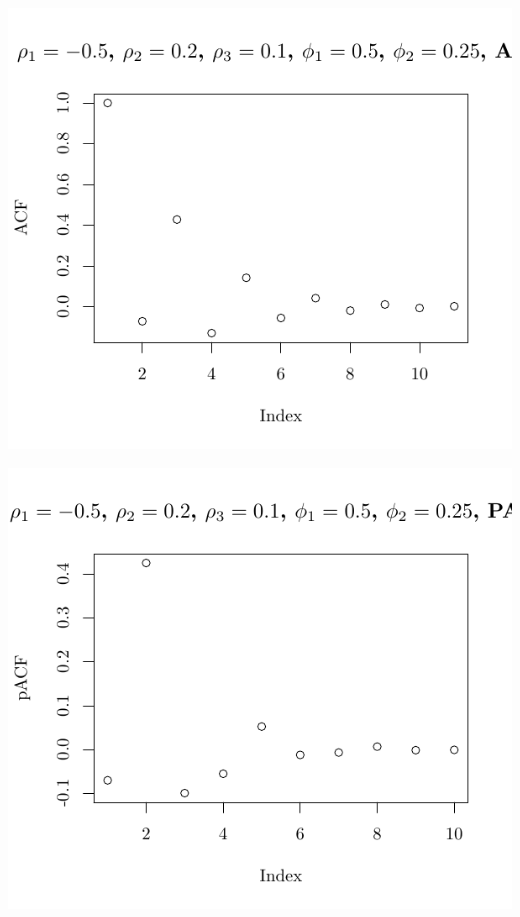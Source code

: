 \documentclass[10pt]{paper}\usepackage[]{graphicx}\usepackage[]{color}
\makeatletter
\def\maxwidth{ %
  \ifdim\Gin@nat@width>\linewidth
    \linewidth
  \else
    \Gin@nat@width
  \fi
}
\newenvironment{knitrout}{}{} %
\makeatother
\begin{document}
\begin{knitrout}
{\centering \includegraphics[width=\maxwidth]{figure/graphics-plotter-175} 

}




{\centering \includegraphics[width=\maxwidth]{figure/graphics-plotter-176} 

}





\end{knitrout}
\end{document}
